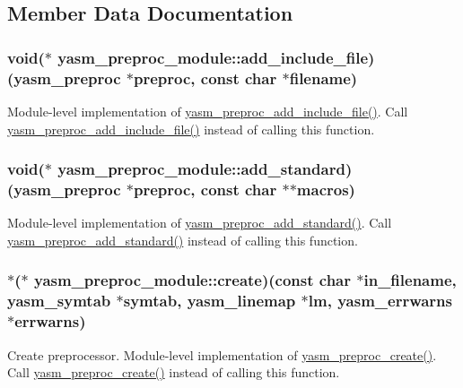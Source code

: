 \subsection{Member Data Documentation}
\hypertarget{structyasm__preproc__module_a1ed21d1f8d493754bfdaeda11074baa2}{
\subsubsection[{add\-\_\-include\-\_\-file}]{\setlength{\rightskip}{0pt plus 5cm}void($\ast$ yasm\-\_\-preproc\-\_\-module\-::add\-\_\-include\-\_\-file)({\bf yasm\-\_\-preproc} $\ast$preproc, const char $\ast$filename)}}\label{structyasm__preproc__module_a1ed21d1f8d493754bfdaeda11074baa2}
Module-\/level implementation of \hyperlink{preproc_8h_a230d50ba5a577840748a3d0fc85ea7ac}{yasm\-\_\-preproc\-\_\-add\-\_\-include\-\_\-file()}. Call \hyperlink{preproc_8h_a230d50ba5a577840748a3d0fc85ea7ac}{yasm\-\_\-preproc\-\_\-add\-\_\-include\-\_\-file()} instead of calling this function. \hypertarget{structyasm__preproc__module_a30b205d2b32e4b74f0200658455a00eb}{
\subsubsection[{add\-\_\-standard}]{\setlength{\rightskip}{0pt plus 5cm}void($\ast$ yasm\-\_\-preproc\-\_\-module\-::add\-\_\-standard)({\bf yasm\-\_\-preproc} $\ast$preproc, const char $\ast$$\ast$macros)}}\label{structyasm__preproc__module_a30b205d2b32e4b74f0200658455a00eb}
Module-\/level implementation of \hyperlink{preproc_8h_ac4acb60c08a2403845a10cf9ff203348}{yasm\-\_\-preproc\-\_\-add\-\_\-standard()}. Call \hyperlink{preproc_8h_ac4acb60c08a2403845a10cf9ff203348}{yasm\-\_\-preproc\-\_\-add\-\_\-standard()} instead of calling this function. \hypertarget{structyasm__preproc__module_a685fc7d6db02337fde333a26ea43896b}{
\subsubsection[{create}]{$\ast$($\ast$ yasm\-\_\-preproc\-\_\-module\-::create)(const char $\ast$in\-\_\-filename, {\bf yasm\-\_\-symtab} $\ast$symtab, {\bf yasm\-\_\-linemap} $\ast$lm, {\bf yasm\-\_\-errwarns} $\ast$errwarns)}}\label{structyasm__preproc__module_a685fc7d6db02337fde333a26ea43896b}
Create preprocessor. Module-\/level implementation of \hyperlink{preproc_8h_acf9e3bc758f55c8a79ef77331d8f7306}{yasm\-\_\-preproc\-\_\-create()}. Call \hyperlink{preproc_8h_acf9e3bc758f55c8a79ef77331d8f7306}{yasm\-\_\-preproc\-\_\-create()} instead of calling this function.



